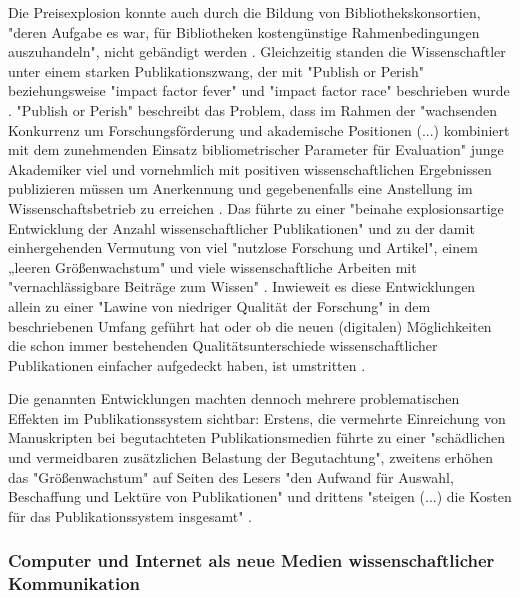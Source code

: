 Die Preisexplosion konnte auch durch die Bildung von Bibliothekskonsortien, "deren Aufgabe es war, für Bibliotheken kostengünstige Rahmenbedingungen auszuhandeln", nicht gebändigt werden \cite{Fladung_2003} \cite{Brintzinger_2010}. Gleichzeitig standen die Wissenschaftler unter einem starken Publikationszwang, der mit "Publish or Perish" \cite{CLAPHAM_2005} beziehungsweise "impact factor fever" \cite{Cherubini_2008} und "impact factor race" \cite{Brischoux_2009} beschrieben wurde \cite{offhaus_2012_institutionelle_repos}. "Publish or Perish" beschreibt das Problem, dass im Rahmen der "wachsenden Konkurrenz um Forschungsförderung und akademische Positionen (...) kombiniert mit dem zunehmenden Einsatz bibliometrischer Parameter für Evaluation" \cite{Fanelli_2010} junge Akademiker viel und vornehmlich mit positiven wissenschaftlichen Ergebnissen publizieren müssen um Anerkennung und gegebenenfalls eine Anstellung im Wissenschaftsbetrieb zu erreichen \cite{pscheida_2010_wikipedia} \cite{Beasley_2005} \cite{hamilton_1990_publishing}. Das führte zu einer "beinahe explosionsartige Entwicklung der Anzahl wissenschaftlicher Publikationen" \cite{bortz_Doering_2006_fragestellung} und zu der damit einhergehenden Vermutung von viel "nutzlose Forschung und Artikel"\cite{smith1990killing}, einem „leeren Größenwachstum" \cite{bbaw_publizieren_2015} und viele wissenschaftliche Arbeiten mit "vernachlässigbare Beiträge zum Wissen" \cite{hamilton_1990_publishing}. Inwieweit es diese Entwicklungen allein zu einer "Lawine von niedriger Qualität der Forschung" \cite{Bauerlein_2010} in dem beschriebenen Umfang geführt hat oder ob die neuen (digitalen) Möglichkeiten die schon immer bestehenden Qualitätsunterschiede wissenschaftlicher Publikationen einfacher aufgedeckt haben, ist umstritten \cite{rekdal_2014_academic}.

Die genannten Entwicklungen machten dennoch mehrere problematischen Effekten im Publikationssystem sichtbar: Erstens, die vermehrte Einreichung von Manuskripten bei begutachteten Publikationsmedien führte zu einer "schädlichen und vermeidbaren zusätzlichen Belastung der Begutachtung", zweitens erhöhen das "Größenwachstum" auf Seiten des Lesers "den Aufwand für Auswahl, Beschaffung und Lektüre von Publikationen" und drittens "steigen (...) die Kosten für das Publikationssystem insgesamt" \cite{bbaw_publizieren_2015}.

\subsubsection{Computer und Internet als neue Medien wissenschaftlicher Kommunikation}

